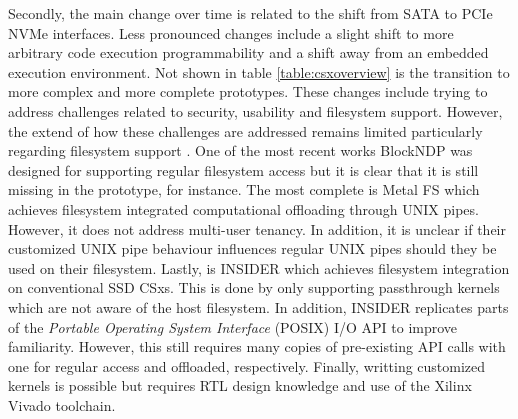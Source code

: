 Secondly, the main change over time is related to the shift from SATA to PCIe
NVMe interfaces. Less pronounced changes include a slight shift to more
arbitrary code execution programmability and a shift away from an embedded
execution environment. Not shown in table \ref{table:csxoverview} is the
transition to more complex and more complete prototypes. These changes include
trying to address challenges related to security, usability and filesystem
support. However, the extend of how these challenges are addressed remains
limited particularly regarding filesystem support \cite{barbalacecomputational}.
One of the most recent works BlockNDP \cite{10.1145/3429357.3430519} was
designed for supporting regular filesystem access but it is clear that it is
still missing in the prototype, for instance\footnotemark[4]. The most complete
is Metal FS \cite{10.1145/3342195.3387557} which achieves filesystem integrated
computational offloading through UNIX pipes. However, it does not address
multi-user tenancy. In addition, it is unclear if their customized UNIX pipe
behaviour influences regular UNIX pipes should they be used on their filesystem.
Lastly, is INSIDER \cite{234968} which achieves filesystem integration on
conventional SSD CSxs. This is done by only supporting passthrough kernels which
are not aware of the host filesystem. In addition, INSIDER replicates parts of
the \textit{Portable Operating System Interface} (POSIX) I/O API to improve
familiarity. However, this still requires many copies of pre-existing API calls
with one for regular access and offloaded, respectively. Finally, writting
customized kernels is possible but requires RTL design knowledge and use of the
Xilinx Vivado toolchain.


